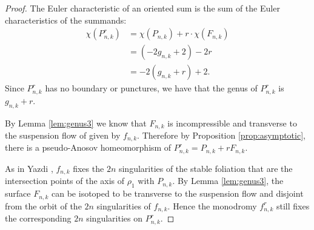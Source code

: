 \begin{proof}
  The Euler characteristic of an oriented sum is the sum of the Euler characteristics of the summands:
  \begin{align*}
    \chi(P^r_{n,k}) &= \chi(P_{n,k}) + r\cdot\chi(F_{n,k}) \\
                    &= (-2g_{n,k} + 2)-2r \\
                    &= -2(g_{n,k} + r) + 2.
  \end{align*}
  Since $P_{n,k}^r$ has no boundary or punctures, we have that the genus of $P_{n,k}^r$ is $g_{n,k}+r$.

  By Lemma \ref{lem:genus3} we know that $F_{n,k}$ is incompressible and transverse to the suspension flow of given by $f_{n,k}$.  Therefore by Proposition \ref{prop:asymptotic}, there is a pseudo-Anosov homeomorphism of $P_{n,k}^r=P_{n,k}+rF_{n,k}$.

 As in Yazdi \cite[Lemma 3.5]{yazdibounds}, $f_{n,k}$ fixes the $2n$ singularities of the stable foliation that are the intersection points of the axis of $\rho_1$ with
  $P_{n,k}$. By Lemma \ref{lem:genus3}, the surface $F_{n,k}$ can be isotoped to be transverse to
  the suspension flow and disjoint from the orbit of the $2n$ singularities of $f_{n,k}$.  Hence the monodromy
  $f^r_{n,k}$ still fixes the corresponding $2n$ singularities on $P^r_{n,k}$.
\end{proof}

